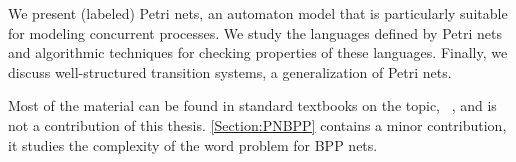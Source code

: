 \documentclass[../../diss.tex]{subfiles}
\begin{document}
We present (labeled) Petri nets, an automaton model that is particularly suitable for modeling concurrent processes.
We study the languages defined by Petri nets and algorithmic techniques for checking properties of these languages.
Finally, we discuss well-structured transition systems, a generalization of Petri nets.

Most of the material can be found in standard textbooks on the topic, \eg~\cite{Reisig85}, and is not a contribution of this thesis.
\cref{Section:PNBPP} contains a minor contribution, it studies the complexity of the word problem for BPP nets.
\end{document}
